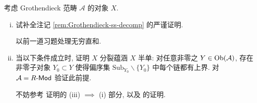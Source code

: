 \begin{Exercises}
	\item 考虑 Grothendieck 范畴 $\mathcal{A}$ 的对象 $X$.
	\begin{enumerate}[(i)]
		\item 试补全注记 \ref{rem:Grothendieck-ss-decomp} 的严谨证明.
		\begin{hint}
			以前一道习题处理无穷直和.
		\end{hint}
		\item 当以下条件成立时, 证明 $X$ 分裂蕴涵 $X$ 半单: 对任意非零之 $Y \in \operatorname{Ob}(\mathcal{A})$, 存在非零子对象 $Y_0 \subset Y$ 使得偏序集 $\mathrm{Sub}_{Y_0} \smallsetminus \{Y_0\}$ 中每个链都有上界. 对 $\mathcal{A} = R\text{-}\mathsf{Mod}$ 验证此前提.
		\begin{hint}
			不妨参考 \cite[命题 6.11.4]{Li1} 证明的 (iii) $\implies$ (i) 部分, 以及 \cite[引理 6.11.3]{Li1} 的证明.
		\end{hint}
	\end{enumerate}
\end{Exercises}
